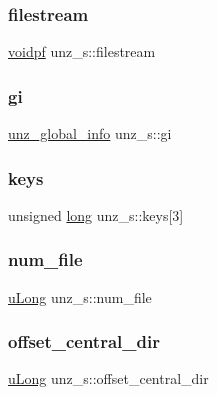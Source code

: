 \subsubsection{\texorpdfstring{filestream}{filestream}}
{\footnotesize\ttfamily \hyperlink{ioapi_8h_a39ab6d73c1cd44bc17064c2dcbb3e753}{voidpf} unz\+\_\+s\+::filestream}

\mbox{\label{structunz__s_a131303f89af11a26b53e99a58d6517cf}} 
\subsubsection{\texorpdfstring{gi}{gi}}
{\footnotesize\ttfamily \hyperlink{unzip_8h_a18c3b238618ea86ef503ecbd4092dbce}{unz\+\_\+global\+\_\+info} unz\+\_\+s\+::gi}

\mbox{\label{structunz__s_a55d75bacbbaf31b1e796e222c0388f34}} 
\subsubsection{\texorpdfstring{keys}{keys}}
{\footnotesize\ttfamily unsigned \hyperlink{ioapi_8h_a3c7b35ad9dab18b8310343c201f7b27e}{long} unz\+\_\+s\+::keys\mbox{[}3\mbox{]}}

\mbox{\label{structunz__s_a737337b347bd5cc52bfabdcfbc11b853}} 
\subsubsection{\texorpdfstring{num\+\_\+file}{num\_file}}
{\footnotesize\ttfamily \hyperlink{ioapi_8h_a50e9e9d5c30e481de822ad68fe537986}{u\+Long} unz\+\_\+s\+::num\+\_\+file}

\mbox{\label{structunz__s_ac6c37ef70549769fa59bca623565d78f}} 
\subsubsection{\texorpdfstring{offset\+\_\+central\+\_\+dir}{offset\_central\_dir}}
{\footnotesize\ttfamily \hyperlink{ioapi_8h_a50e9e9d5c30e481de822ad68fe537986}{u\+Long} unz\+\_\+s\+::offset\+\_\+central\+\_\+dir}

